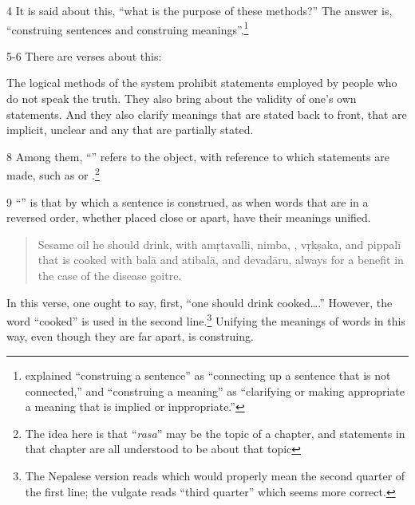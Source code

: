 \begin{translation}
\item [4] It is said about this, “what is the purpose of these methods?”
The answer is, “construing sentences and construing
meanings”.\footnote{ explained “construing a
    sentence” as “connecting up a sentence that is not connected,” and
    “construing a meaning” as “clarifying  or making appropriate a meaning
    that is implied or inppropriate.”}

\item [5-6] There are  verses about this:
  
\begin{sloka}
The logical methods of the system prohibit
statements employed by people who do not speak the truth.
They also bring about the validity of one’s own
statements.  And they also clarify meanings that are stated back to
front, that are implicit, unclear and any that are partially stated.
\end{sloka}

\item [8] Among them, “” refers to the object, with 
reference to which statements are made, such as  or 
.\footnote{The idea here is that “\emph{rasa}” may be the 
topic of a chapter, and statements in that chapter are all understood to be about 
that topic}

\item [9] “” is that by which a sentence
is construed, as when words that are in a reversed order, whether placed close
or apart, have their meanings unified.
\begin{quote}
    Sesame oil he should drink, with 
\gls{amṛtavalli}, 
\gls{nimba},
,
\gls{vṛkṣaka}, and
\gls{pippalī}
\\[2ex]
that is cooked with 
\gls{balā} and \gls{atibalā}, %
and
\gls{devadāru},
always for a benefit in the case of the disease goitre.
\end{quote}
In this verse, one ought to say, first, “one should drink
cooked\ldots.” However, the word “cooked” is used in the second
line.\footnote{The Nepalese version reads  which would
    properly mean the second quarter of the first line; the vulgate reads
    “third quarter” which seems more correct.} Unifying the meanings of words in
    this way, even though they are far apart, is construing. 
 


\end{translation}
